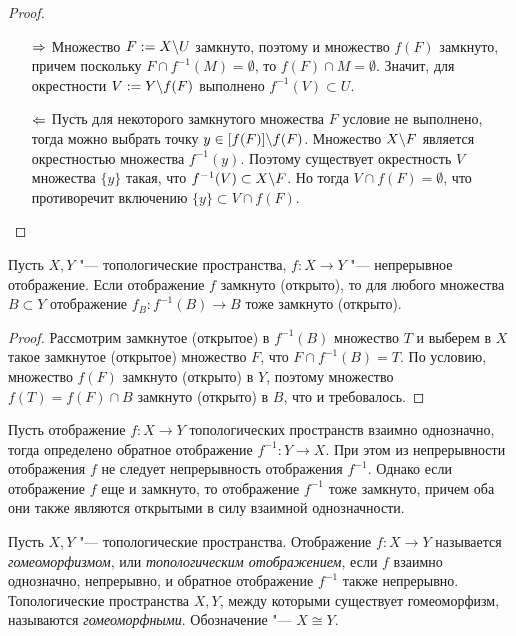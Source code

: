 \begin{proof}~
	\begin{itemize}
		\item[$\Rightarrow$] Множество $F := X \backslash U$ замкнуто, поэтому и множество $f(F)$ замкнуто, причем поскольку $F \cap f^{-1}(M) = \emptyset$, то $f(F) \cap M = \emptyset$. Значит, для окрестности $V := Y \backslash f(F)$ выполнено $f^{-1}(V) \subset U$.
		
		\item[$\Leftarrow$] Пусть для некоторого замкнутого множества $F$ условие не выполнено, тогда можно выбрать точку $y \in [f(F)] \backslash f(F)$. Множество $X \backslash F$ является окрестностью множества $f^{-1}(y)$. Поэтому существует окрестность $V$ множества $\{y\}$ такая, что $f^{-1}(V) \subset X \backslash F$. Но тогда $V \cap f(F) = \emptyset$, что противоречит включению $\{y\} \subset V \cap f(F)$.\qedhere
	\end{itemize}
\end{proof}

\begin{proposition}
	Пусть $X, Y$ "--- топологические пространства, $f: X \to Y$ "--- непрерывное отображение. Если отображение $f$ замкнуто (открыто), то для любого множества $B \subset Y$ отображение $f_{B}: f^{-1}(B) \rightarrow B$ тоже замкнуто (открыто).
\end{proposition}

\begin{proof}
	Рассмотрим замкнутое (открытое) в $f^{-1}(B)$ множество $T$ и выберем в $X$ такое замкнутое (открытое) множество $F$, что $F \cap f^{-1}(B) = T$. По условию, множество $f(F)$ замкнуто (открыто) в $Y$, поэтому множество $f(T) = f(F) \cap B$ замкнуто (открыто) в $B$, что и требовалось.
\end{proof}

\begin{note}
	Пусть отображение $f: X \rightarrow Y$ топологических пространств взаимно однозначно, тогда определено обратное отображение $f^{-1}: Y \to X$. При этом из непрерывности отображения $f$ не следует непрерывность отображения $f^{-1}$. Однако если отображение $f$ еще и замкнуто, то отображение $f^{-1}$ тоже замкнуто, причем оба они также являются открытыми в силу взаимной однозначности.
\end{note}

\begin{definition}
	Пусть $X, Y$ "--- топологические пространства. Отображение $f: X \rightarrow Y$ называется \textit{гомеоморфизмом}, или \textit{топологическим отображением}, если $f$ взаимно однозначно, непрерывно, и обратное отображение $f^{-1}$ также непрерывно. Топологические пространства $X, Y$, между которыми существует гомеоморфизм, называются \textit{гомеоморфными}. Обозначение "--- $X \cong Y$.
\end{definition}

